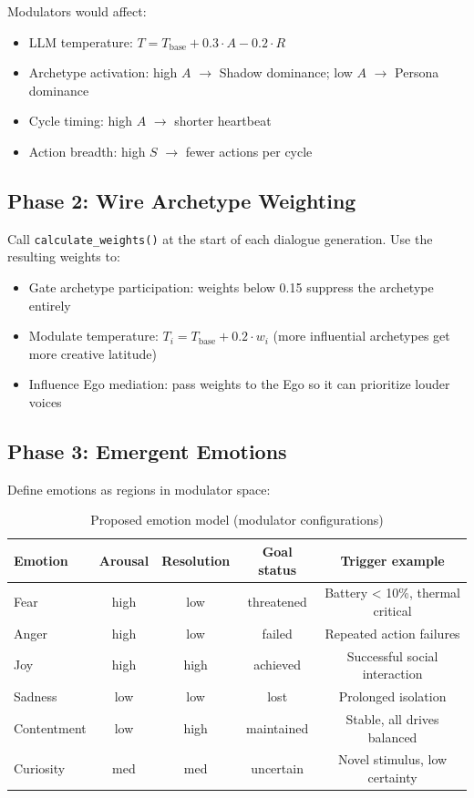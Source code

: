 \documentclass[11pt,oneside]{article}
\begin{document}
Modulators would affect:
\begin{itemize}
  \item LLM temperature: $T = T_{\text{base}} + 0.3 \cdot A - 0.2 \cdot R$
  \item Archetype activation: high $A$ $\to$ Shadow dominance; low $A$ $\to$ Persona dominance
  \item Cycle timing: high $A$ $\to$ shorter heartbeat
  \item Action breadth: high $S$ $\to$ fewer actions per cycle
\end{itemize}

\subsection{Phase 2: Wire Archetype Weighting}

Call \texttt{calculate\_weights()} at the start of each dialogue generation.
Use the resulting weights to:
\begin{itemize}
  \item Gate archetype participation: weights below 0.15 suppress the archetype entirely
  \item Modulate temperature: $T_i = T_{\text{base}} + 0.2 \cdot w_i$ (more influential archetypes get more creative latitude)
  \item Influence Ego mediation: pass weights to the Ego so it can prioritize louder voices
\end{itemize}

\subsection{Phase 3: Emergent Emotions}

Define emotions as regions in modulator space:

\begin{table}[H]
\centering
\caption{Proposed emotion model (modulator configurations)}
\label{tab:emotions}
\small
\begin{tabular}{l c c c c}
\toprule
\textbf{Emotion} & \textbf{Arousal} & \textbf{Resolution} & \textbf{Goal status} & \textbf{Trigger example} \\
\midrule
Fear        & high  & low  & threatened  & Battery < 10\%, thermal critical \\
Anger       & high  & low  & failed      & Repeated action failures \\
Joy         & high  & high & achieved    & Successful social interaction \\
Sadness     & low   & low  & lost        & Prolonged isolation \\
Contentment & low   & high & maintained  & Stable, all drives balanced \\
Curiosity   & med   & med  & uncertain   & Novel stimulus, low certainty \\
\bottomrule
\end{tabular}
\end{table}
\end{document}
